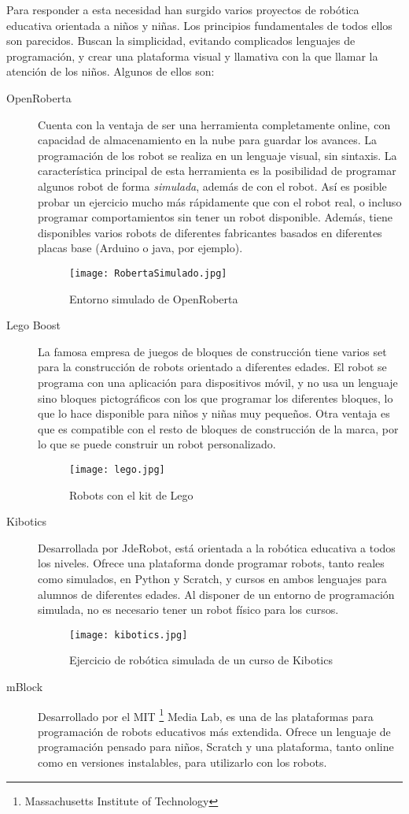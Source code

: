 Para responder a esta necesidad han surgido varios proyectos de robótica educativa orientada a niños y niñas. Los principios fundamentales de todos ellos son parecidos. Buscan la simplicidad, evitando complicados lenguajes de programación, y crear una plataforma visual y llamativa con la que llamar la atención de los niños. Algunos de ellos son:
\begin{description}
	\item [OpenRoberta]\cite{Roberta} Cuenta con la ventaja de ser una herramienta completamente online, con capacidad de almacenamiento en la nube para guardar los avances. La programación de los robot se realiza en un lenguaje visual, sin sintaxis. La característica principal de esta herramienta es la posibilidad de programar algunos robot de forma \textit{simulada}, además de con el robot. Así es posible probar un ejercicio mucho más rápidamente que con el robot real, o incluso programar comportamientos sin tener un robot disponible. Además, tiene disponibles varios robots de diferentes fabricantes basados en diferentes placas base (Arduino o java, por ejemplo). 	
	\begin{figure}[h]
		\centering
		\texttt{[image: RobertaSimulado.jpg]}
		\caption{Entorno simulado de OpenRoberta}
		\label{img:roberta}
	\end{figure}
	
	\item [Lego Boost]\cite{Lego} La famosa empresa de juegos de bloques de construcción tiene varios set para la construcción de robots orientado a diferentes edades. El robot se programa con una aplicación para dispositivos móvil, y no usa un lenguaje sino bloques pictográficos con los que programar los diferentes bloques, lo que lo hace disponible para niños y niñas muy pequeños. Otra ventaja es que es compatible con el resto de bloques de construcción de la marca, por lo que se puede construir un robot personalizado.
	\begin{figure}[h]
		\centering
		\texttt{[image: lego.jpg]}
		\caption{Robots con el kit de Lego}
		\label{img:lego}
	\end{figure}
	
	\item [Kibotics]\cite{kibotics} Desarrollada por JdeRobot, está orientada a la robótica educativa a todos los niveles. Ofrece una plataforma donde programar robots, tanto reales como simulados, en Python y Scratch, y cursos en ambos lenguajes para alumnos de diferentes edades. Al disponer de un entorno de programación simulada, no es necesario tener un robot físico para los cursos. 
	\begin{figure}[h]
		\centering
		\texttt{[image: kibotics.jpg]}
		\caption{Ejercicio de robótica simulada de un curso de Kibotics}
		\label{img:kibotics}
	\end{figure}
	\item [mBlock]\cite{mblock} Desarrollado por el MIT \footnote{Massachusetts Institute of Technology} Media Lab, es una de las plataformas para programación de robots educativos más extendida. Ofrece un lenguaje de programación pensado para niños, Scratch y una plataforma, tanto online como en versiones instalables, para utilizarlo con los robots.
	

\end{description}
